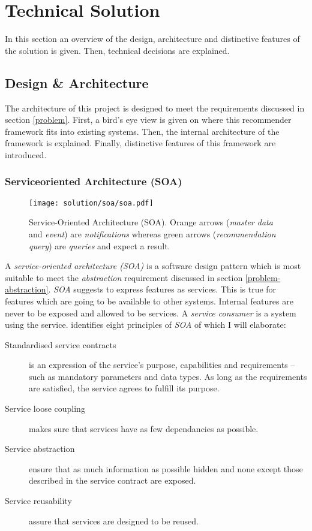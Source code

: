 \chapter{Technical Solution}

In this section an overview of the design, architecture and distinctive features of the solution is given. Then, technical decisions are explained.



\section{Design \& Architecture}

The architecture of this project is designed to meet the requirements discussed in section \ref{problem}. First, a bird's eye view is given on where this recommender framework fits into existing systems. Then, the internal architecture of the framework is explained. Finally, distinctive features of this framework are introduced.

\subsection{Serviceoriented Architecture (SOA)}
\label{sol-design-soa}

\begin{figure}[ht]
    \texttt{[image: solution/soa/soa.pdf]}
    \caption[Service-Oriented Architecture (SOA)]{Service-Oriented Architecture (SOA). Orange arrows (\emph{master data} and \emph{event}) are \emph{notifications} whereas green arrows (\emph{recommendation query}) are \emph{queries} and expect a result.}
    \label{fig:soa}
\end{figure}

A \emph{service-oriented architecture (SOA)} is a software design pattern which is most suitable to meet the \emph{abstraction} requirement discussed in section \ref{problem-abstraction}. \emph{SOA} suggests to express features as services. This is true for features which are going to be available to other systems. Internal features are never to be exposed and allowed to be services. A \emph{service consumer} is a system using the service. \cite{erl08} identifies eight principles of \emph{SOA} of which I will elaborate:

\begin{description}
    \item[Standardised service contracts] is an expression of the service's purpose, capabilities and requirements -- such as mandatory parameters and data types. As long as the requirements are satisfied, the service agrees to fulfill its purpose.
    \item[Service loose coupling] makes sure that services have as few dependancies as possible.
    \item[Service abstraction] ensure that as much information as possible hidden and none except those described in the service contract are exposed.
    \item[Service reusability] assure that services are designed to be reused.
\end{description}


